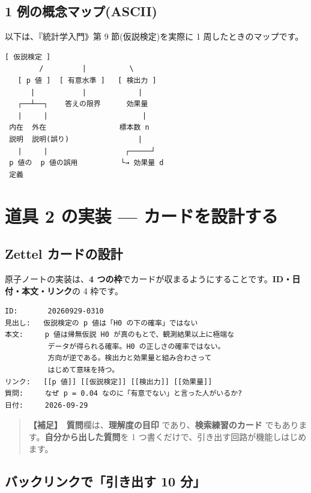 \documentclass{article}
\begin{document}
\subsection{1 例の概念マップ(ASCII)}

以下は、『統計学入門》第 9 節(仮説検定)を実際に 1 周したときのマップです。

\begin{lstlisting}[language=Text]
              [ 仮説検定 ]
        /         |          \
   [ p 値 ]  [ 有意水準 ]   [ 検出力 ]
      |           |            |
   ┌──┴──┐    答えの限界      効果量
   |     |                      |
 内在  外在                 標本数 n
 説明  説明(誤り)                |
   |     |                  ┌─────┘
 p 値の  p 値の誤用          └→ 効果量 d
 定義
\end{lstlisting}

\section{道具 2 の実装 — カードを設計する}

\subsection{Zettel カードの設計}

原子ノートの実装は、\textbf{4 つの枠}でカードが収まるようにすることです。\textbf{ID・日付・本文・リンク}の 4 枠です。

\begin{lstlisting}[language=Text]
ID:       20260929-0310
見出し:   仮説検定の p 値は「H0 の下の確率」ではない
本文:     p 値は帰無仮説 H0 が真のもとで、観測結果以上に極端な
          データが得られる確率。H0 の正しさの確率ではない。
          方向が逆である。検出力と効果量と組み合わさって
          はじめて意味を持つ。
リンク:   [[p 値]] [[仮説検定]] [[検出力]] [[効果量]]
質問:     なぜ p = 0.04 なのに「有意でない」と言った人がいるか?
日付:     2026-09-29
\end{lstlisting}

\begin{quote}
\textbf{【補足】}\ \textbf{質問}欄は、\textbf{理解度の目印} であり、\textbf{検索練習のカード} でもあります。\textbf{自分から出した質問}を 1 つ書くだけで、引き出す回路が機能しはじめます。
\end{quote}

\subsection{バックリンクで「引き出す 10 分」}
\end{document}
